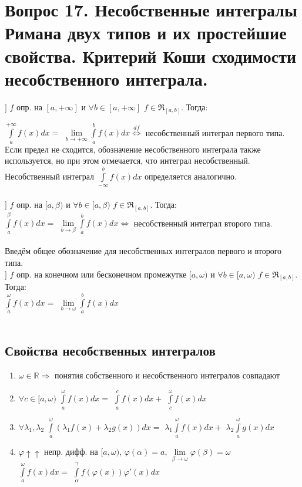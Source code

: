 \documentclass{article}
\begin{document}
\section{Вопрос 17. Несобственные интегралы Римана двух типов и их простейшие свойства. Критерий Коши сходимости несобственного интеграла.}
$]$ $f$ опр. на $[a,+\infty]$ и $\forall b \in [a,+\infty]$ $f \in \Re_{[a,b]}$. Тогда:

$\displaystyle\int\limits_a^{+\infty} f(x)dx =$ $\lim\limits_{b \to +\infty} \displaystyle\int\limits_a^b f(x)dx \overset{df}\Leftrightarrow$ несобственный интеграл первого типа. \\
Если предел не сходится, обозначение несобственного интеграла также используется, но при этом отмечается, что интеграл несобственный. Несобственный интеграл $\displaystyle\int\limits_{-\infty}^b f(x)dx$ определяется аналогично. \\ \\
$]$ $f$ опр. на $[a, \beta)$ и $\forall b \in [a,\beta)$ $f \in \Re_{[a,b]}$. Тогда: \\
$\displaystyle\int\limits_a^\beta f(x)dx =$ $\lim\limits_{b \to \beta} \displaystyle\int\limits_a^b f(x)dx \Leftrightarrow$ несобственный интеграл второго типа. \\ \\

Введём общее обозначение для несобственных интегралов первого и второго типа. \\
$]$ $f$ опр. на конечном или бесконечном промежутке $[a, \omega)$ и $\forall b \in [a,\omega)$ $f \in \Re_{[a,b]}$. Тогда: \\
$\displaystyle\int\limits_a^\omega f(x)dx =$ $\lim\limits_{b \to \omega} \displaystyle\int\limits_a^b f(x)dx$ \\ \\

\subsection*{Свойства несобственных интегралов}
\begin{enumerate}
    \item $\omega \in \mathbb{R} \Rightarrow$ понятия собственного и несобственного интегралов совпадают
    \item $\forall c \in [a,\omega)$ $\displaystyle\int\limits_a^\omega f(x)dx =$ $\displaystyle\int\limits_a^c f(x)dx +$ $\displaystyle\int\limits_c^\omega f(x)dx$
    \item $\forall \lambda_1, \lambda_2$ $\displaystyle\int\limits_a^\omega (\lambda_1 f(x) + \lambda_2 g(x))dx =$ $\lambda_1\displaystyle\int\limits_a^\omega f(x)dx +$ $\lambda_2\displaystyle\int\limits_a^\omega g(x)dx$
    \item $\varphi\uparrow\uparrow$ непр. дифф. на $[a,\omega)$, $\varphi(\alpha) = a$, $\lim\limits_{\beta \to \omega}{\varphi(\beta)} = \omega$ \\
$\displaystyle\int\limits_a^\omega f(x)dx =$ $\displaystyle\int\limits_\alpha^\gamma f(\varphi(x))\varphi'(x)dx$
\end{enumerate}
\end{document}
